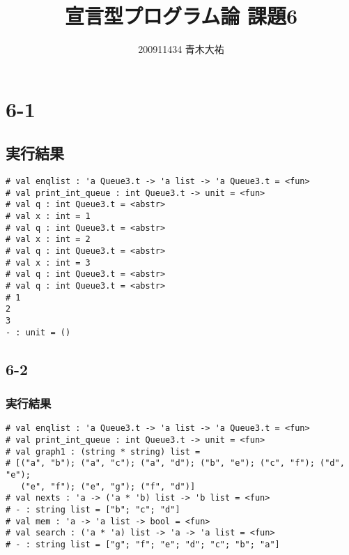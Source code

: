 \documentclass[a4paper,8pt]{jarticle}
\title{宣言型プログラム論 課題6}
\author{200911434 青木大祐}
\begin{document}
\maketitle
\newpage
\section*{6-1}


\subsection*{実行結果}
\begin{lstlisting}
# val enqlist : 'a Queue3.t -> 'a list -> 'a Queue3.t = <fun>
# val print_int_queue : int Queue3.t -> unit = <fun>
# val q : int Queue3.t = <abstr>
# val x : int = 1
# val q : int Queue3.t = <abstr>
# val x : int = 2
# val q : int Queue3.t = <abstr>
# val x : int = 3
# val q : int Queue3.t = <abstr>
# val q : int Queue3.t = <abstr>
# 1
2
3
- : unit = ()
\end{lstlisting}

\subsection*{6-2}

\subsubsection*{実行結果}
\begin{lstlisting}
# val enqlist : 'a Queue3.t -> 'a list -> 'a Queue3.t = <fun>
# val print_int_queue : int Queue3.t -> unit = <fun>
# val graph1 : (string * string) list =
# [("a", "b"); ("a", "c"); ("a", "d"); ("b", "e"); ("c", "f"); ("d", "e");
   ("e", "f"); ("e", "g"); ("f", "d")]
# val nexts : 'a -> ('a * 'b) list -> 'b list = <fun>
# - : string list = ["b"; "c"; "d"]
# val mem : 'a -> 'a list -> bool = <fun>
# val search : ('a * 'a) list -> 'a -> 'a list = <fun>
# - : string list = ["g"; "f"; "e"; "d"; "c"; "b"; "a"]
\end{lstlisting}
\end{document}
